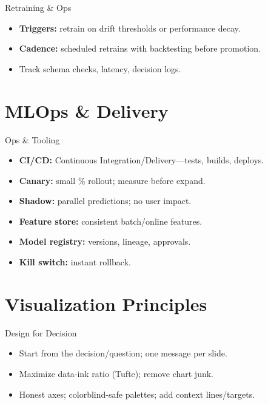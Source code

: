 \documentclass[aspectratio=169]{beamer}
\begin{document}
\begin{frame}{Retraining \& Ops}
  \begin{itemize}
    \item \textbf{Triggers:} retrain on drift thresholds or performance decay.
    \item \textbf{Cadence:} scheduled retrains with backtesting before promotion.
    \item Track schema checks, latency, decision logs.
  \end{itemize}
\end{frame}

\section{MLOps \& Delivery}
\begin{frame}{Ops \& Tooling}
  \begin{itemize}
    \item \textbf{CI/CD:} Continuous Integration/Delivery---tests, builds, deploys.
    \item \textbf{Canary:} small \% rollout; measure before expand.
    \item \textbf{Shadow:} parallel predictions; no user impact.
    \item \textbf{Feature store:} consistent batch/online features.
    \item \textbf{Model registry:} versions, lineage, approvals.
    \item \textbf{Kill switch:} instant rollback.
  \end{itemize}
\end{frame}

\section{Visualization Principles}
\begin{frame}{Design for Decision}
  \begin{itemize}
    \item Start from the decision/question; one message per slide.
    \item Maximize data-ink ratio (Tufte); remove chart junk.
    \item Honest axes; colorblind-safe palettes; add context lines/targets.
  \end{itemize}
\end{frame}
\end{document}
